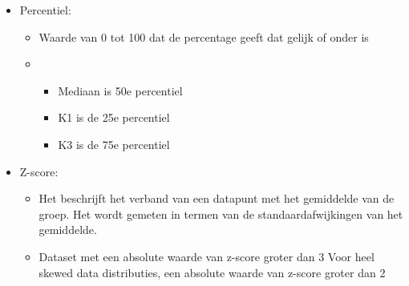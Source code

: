 \documentclass[12pt]{article}
\begin{document}
\begin{itemize}
    \item Percentiel:\begin{itemize}
        \item Waarde van 0 tot 100 dat de percentage geeft dat gelijk of onder is 
        \item \begin{itemize}
            \item Mediaan is 50e percentiel 
            \item K1 is de 25e percentiel 
            \item K3 is de 75e percentiel
        \end{itemize}
    \end{itemize}
    \item Z-score:\begin{itemize}
        \item Het beschrijft het verband van een datapunt met het gemiddelde
        van de groep. Het wordt gemeten in termen van de
        standaardafwijkingen van het gemiddelde.
        \item Dataset met een absolute waarde van z-score groter dan 3
        Voor heel skewed data distributies, een absolute waarde van z-score
        groter dan 2
    \end{itemize}
\end{itemize}
\end{document}

